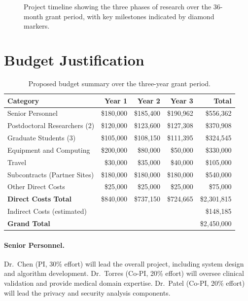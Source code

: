 \documentclass[12pt,letterpaper]{article}
\begin{document}
\begin{figure}[H]
\centering
{}
\caption{Project timeline showing the three phases of research over the 36-month grant period, with key milestones indicated by diamond markers.}
\label{fig:timeline}
\end{figure}

\section{Budget Justification}
\label{sec:budget}

\begin{table}[H]
\centering
\caption{Proposed budget summary over the three-year grant period.}
\label{tab:budget}
\begin{tabular}{lrrrr}
\hline
\textbf{Category} & \textbf{Year 1} & \textbf{Year 2} & \textbf{Year 3} & \textbf{Total} \\
\hline
Senior Personnel & \$180,000 & \$185,400 & \$190,962 & \$556,362 \\
Postdoctoral Researchers (2) & \$120,000 & \$123,600 & \$127,308 & \$370,908 \\
Graduate Students (3) & \$105,000 & \$108,150 & \$111,395 & \$324,545 \\
Equipment and Computing & \$200,000 & \$80,000 & \$50,000 & \$330,000 \\
Travel & \$30,000 & \$35,000 & \$40,000 & \$105,000 \\
Subcontracts (Partner Sites) & \$180,000 & \$180,000 & \$180,000 & \$540,000 \\
Other Direct Costs & \$25,000 & \$25,000 & \$25,000 & \$75,000 \\
\hline
\textbf{Direct Costs Total} & \$840,000 & \$737,150 & \$724,665 & \$2,301,815 \\
Indirect Costs (estimated) & & & & \$148,185 \\
\hline
\textbf{Grand Total} & & & & \$2,450,000 \\
\hline
\end{tabular}
\end{table}

\paragraph{Senior Personnel.} Dr.\ Chen (PI, 30\% effort) will lead the overall project, including system design and algorithm development. Dr.\ Torres (Co-PI, 20\% effort) will oversee clinical validation and provide medical domain expertise. Dr.\ Patel (Co-PI, 20\% effort) will lead the privacy and security analysis components.
\end{document}
